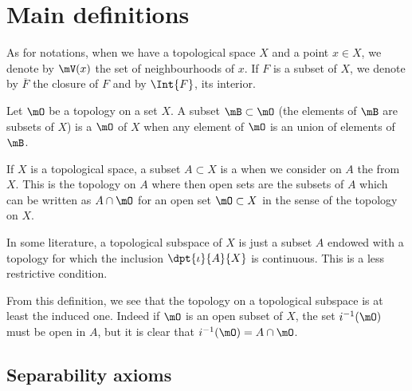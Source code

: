 
\section{Main definitions}

As for notations, when we have a topological space $X$ and a point $x\in X$, we denote by $\mV(x)$ the set of neighbourhoods of $x$. If $F$ is a subset of $X$, we denote by $\overline{F}$ the closure of $F$ and by $\Int{F}$, its interior.

\begin{definition}
	Let $\mO$ be a topology on a set $X$. A subset $\mB\subset\mO$ (the elements of $\mB$ are subsets of $X$) is a  $\mO$ of $X$ when
	any element of $\mO$ is an union of elements of $\mB$.
\end{definition}

\begin{definition}
	If $X$ is a topological space, a subset $A\subset X$ is a  when we consider on $A$ the  from $X$. This is the topology on $A$ where then open sets are the subsets of $A$ which can be written as $A\cap\mO$ for an open set $\mO\subset X$ in the sense of the topology on $X$.
\end{definition}

\begin{remark}
	In some literature, a topological subspace of $X$ is just a subset $A$ endowed with a topology for which the inclusion $\dpt{\iota}{A}{X}$ is continuous. This is a less restrictive condition.
\end{remark}

From this definition, we see that the topology on a topological subspace is at least the induced one. Indeed if $\mO$ is an open subset of $X$, the set $i^{-1}(\mO)$ must be open in $A$, but it is clear that $i^{-1}(\mO)=A\cap \mO$.

\subsection{Separability axioms}	

